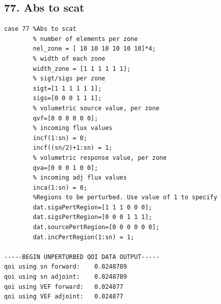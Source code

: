 \documentclass{article}
\begin{document}
\subsection{77. Abs to scat}
\begin{verbatim}
case 77 %Abs to scat
        % number of elements per zone
        nel_zone = [ 10 10 10 10 10 10]*4;
        % width of each zone
        width_zone = [1 1 1 1 1 1];
        % sigt/sigs per zone
        sigt=[1 1 1 1 1 1];
        sigs=[0 0 0 1 1 1];
        % volumetric source value, per zone
        qvf=[0 0 0 0 0 0];
        % incoming flux values
        incf(1:sn) = 0;
        incf((sn/2)+1:sn) = 1;
        % volumetric response value, per zone
        qva=[0 0 0 1 0 0];
        % incoming adj flux values
        inca(1:sn) = 0;
        %Regions to be perturbed. Use value of 1 to specify
        dat.sigaPertRegion=[1 1 1 0 0 0];
        dat.sigsPertRegion=[0 0 0 1 1 1];
        dat.sourcePertRegion=[0 0 0 0 0 0];
        dat.incPertRegion(1:sn) = 1;   
        
-----BEGIN UNPERTURBED QOI DATA OUTPUT----- 
qoi using sn forward: 	 0.0248789 
qoi using sn adjoint: 	 0.0248789 
qoi using VEF forward: 	 0.024877 
qoi using VEF adjoint: 	 0.024877 
\end{verbatim}
\end{document}
